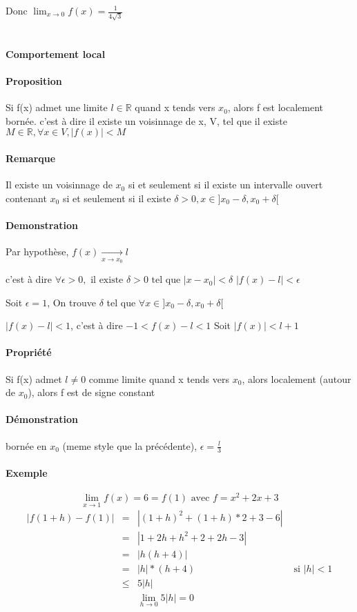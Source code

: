 Donc $\lim_{x \to 0} f(x) = \frac{1}{4\sqrt{3}}$
~\\
~\\

\paragraph{Comportement local}
\paragraph{Proposition} Si f(x) admet une limite $l \in \mathbb{R}$ quand x tends vers $x_0$, alors f est localement bornée.
c'est à dire il existe un voisinnage de x, V, tel que il existe $M \in \mathbb{R}, \forall x \in V, |f(x)| < M$
\paragraph{Remarque} Il existe un voisinnage de $x_0$ si et seulement si il existe un intervalle ouvert contenant $x_0$ si et seulement si il existe $\delta > 0, x \in ]x_0 - \delta, x_0 + \delta[$

\paragraph{Demonstration}
Par hypothèse, $f(x) \xrightarrow[x \to x_0]{} l$

c'est à dire $\forall \epsilon > 0, \text{ il existe } \delta > 0 \text{ tel que } |x-x_0| < \delta$   $|f(x)-l| < \epsilon$

Soit $\epsilon = 1$, On trouve $\delta$ tel que $\forall x \in ]x_0 - \delta, x_0 + \delta[ $

	$|f(x) - l| < 1$, c'est à dire $-1 < f(x) - l < 1$ Soit $|f(x)| < l+1$ 

\paragraph{Propriété}Si f(x) admet $l \neq 0$ comme limite quand x tends vers $x_0$, alors localement (autour de $x_0$), alors f est de signe constant
\paragraph{Démonstration} bornée en $x_0$ (meme style que la précédente), $\epsilon = \frac{l}{3}$

\paragraph{Exemple} \[\lim_{x \to 1} f(x) = 6 = f(1) \text{ avec } f=x^2+2x+3\]
\[\begin{array}{rcll}
	|f(1+h) - f(1)| &=& |(1+h)^2 + (1+h)*2 + 3 - 6| \\
	&=& |1+2h+h^2 + 2 + 2h -3| \\
	&=& |h(h+4)| \\
	&=& |h|*(h+4)  & \text{      si } |h| < 1 \\
	&\leq& 5|h|\\
	&& \lim_{h \to 0} 5|h| = 0
\end{array}\]

